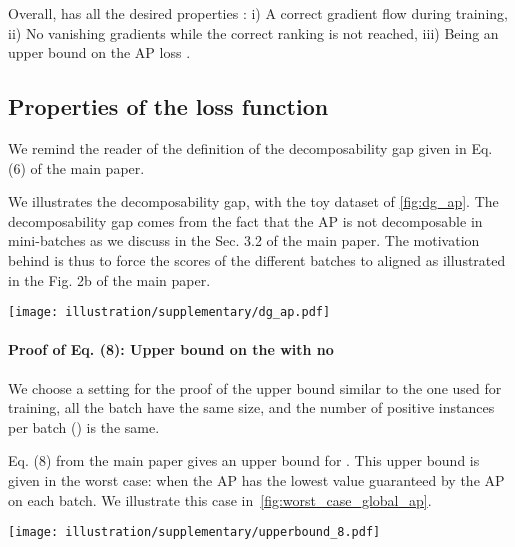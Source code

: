 Overall,  has all the desired properties : i) A correct gradient flow during training, ii) No vanishing gradients while the correct ranking is not reached, iii) Being an upper bound on the AP loss .


\subsection{Properties of the  loss function}

We remind the reader of the definition of the decomposability gap given in Eq. (6) of the main paper.




We illustrates the decomposability gap,  with the toy dataset of \cref{fig:dg_ap}. The decomposability gap comes from the fact that the AP is not decomposable in mini-batches as we discuss in the Sec. 3.2 of the main paper. The motivation behind  is thus to force the scores of the different batches to aligned as illustrated in the Fig. 2b of the main paper.


\begin{figure*}[ht]
    \centering
    \texttt{[image: illustration/supplementary/dg\_ap.pdf]}
    \caption{Illustration of the decomposability gap on a toy dataset.}
    \label{fig:dg_ap}
\end{figure*}





\paragraph*{Proof of Eq. (8): Upper bound on the  with no } We choose a setting for the proof of the upper bound similar to the one used for training, \ie all the batch have the same size, and the number of positive instances per batch (\ie ) is the same.

Eq. (8) from the main paper gives an upper bound for . This upper bound is given in the worst case: when the AP has the lowest value guaranteed by the AP on each batch. We illustrate this case in~\cref{fig:worst_case_global_ap}.

 \begin{figure*}[t]
     \centering
     \texttt{[image: illustration/supplementary/upperbound\_8.pdf]}
     \caption{The worst case when computing the global AP would be that each batch is juxtaposed.}
     \label{fig:worst_case_global_ap}
 \end{figure*}
 
